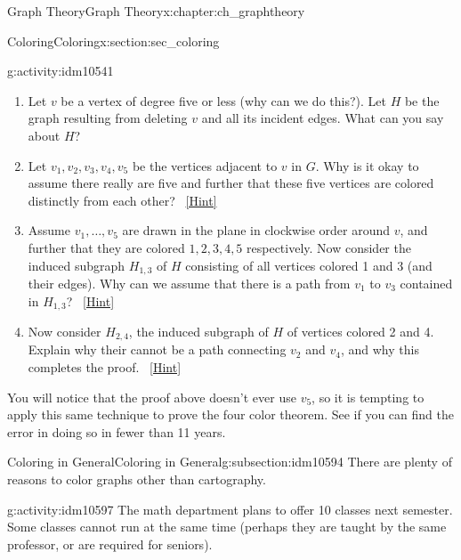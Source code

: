 \documentclass[oneside,10pt,]{book}
\numberwithin{equation}{chapter}
\begin{document}
\begin{chapterptx}{Graph Theory}{}{Graph Theory}{}{}{x:chapter:ch_graphtheory}
\begin{sectionptx}{Coloring}{}{Coloring}{}{}{x:section:sec_coloring}
\begin{introduction}{}
\begin{activity}{}{g:activity:idm10541}
\begin{enumerate}[font=\bfseries,label=(\alph*),ref=\alph*]
\item{}Let \(v\) be a vertex of degree five or less (why can we do this?).  Let \(H\) be the graph resulting from deleting \(v\) and all its incident edges.  What can you say about \(H\)?%
\item{}Let \(v_1, v_2, v_3, v_4, v_5\) be the vertices adjacent to \(v\) in \(G\).  Why is it okay to assume there really are five and further that these five vertices are colored distinctly from each other?%
\qquad~\hfill{\tiny\hyperlink{g:hint:idm10560-back}{[Hint]}}\item{}Assume \(v_1, \ldots, v_5\) are drawn in the plane in clockwise order around \(v\), and further that they are colored \(1,2,3,4,5\) respectively.  Now consider the induced subgraph \(H_{1,3}\) of \(H\) consisting of all vertices colored 1 and 3 (and their edges).  Why can we assume that there is a path from \(v_1\) to \(v_3\) contained in \(H_{1,3}\)?%
\qquad~\hfill{\tiny\hyperlink{g:hint:idm10574-back}{[Hint]}}\item{}Now consider \(H_{2,4}\), the induced subgraph of \(H\) of vertices colored 2 and 4.  Explain why their cannot be a path connecting \(v_2\) and \(v_4\), and why this completes the proof.%
\qquad~\hfill{\tiny\hyperlink{g:hint:idm10586-back}{[Hint]}}\end{enumerate}
\end{activity}
You will notice that the proof above doesn't ever use \(v_5\), so it is tempting to apply this same technique to prove the four color theorem.  See if you can find the error in doing so in fewer than 11 years.%
\end{introduction}%
%
%
\typeout{************************************************}
\typeout{************************************************}
%
\begin{subsectionptx}{Coloring in General}{}{Coloring in General}{}{}{g:subsection:idm10594}
There are plenty of reasons to color graphs other than cartography.%
\begin{activity}{}{g:activity:idm10597}%
The math department plans to offer 10 classes next semester. Some classes cannot run at the same time (perhaps they are taught by the same professor, or are required for seniors).%
\begin{sidebyside}{1}{0}{0}{0}%
\begin{sbspanel}{1}%
{\centering%
\begin{tabular}{cAl}

\end{tabular}}
\end{sbspanel}
\end{sidebyside}
\end{activity}
\end{subsectionptx}
\end{sectionptx}
\end{chapterptx}
\end{document}
